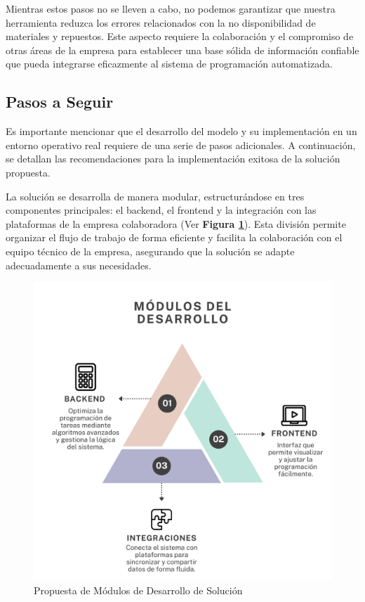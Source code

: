 \documentclass{article}
\begin{document}
Mientras estos pasos no se lleven a cabo, no podemos garantizar que nuestra herramienta reduzca los errores relacionados con la no disponibilidad de materiales y repuestos. Este aspecto requiere la colaboración y el compromiso de otras áreas de la empresa para establecer una base sólida de información confiable que pueda integrarse eficazmente al sistema de programación automatizada.

\subsection{Pasos a Seguir}

Es importante mencionar que el desarrollo del modelo y su implementación en un entorno operativo real requiere de una serie de pasos adicionales. A continuación, se detallan las recomendaciones para la implementación exitosa de la solución propuesta.

La solución se desarrolla de manera modular, estructurándose en tres componentes principales: el backend, el frontend y la integración con las plataformas de la empresa colaboradora (Ver \textbf{Figura \ref{fig:modulos-desarrollo}}). Esta división permite organizar el flujo de trabajo de forma eficiente y facilita la colaboración con el equipo técnico de la empresa, asegurando que la solución se adapte adecuadamente a sus necesidades.

\begin{figure}[htbp]
  \centering
  \includegraphics[scale=0.3]{imgs/ModulosDesarrollo.png}
  \caption{Propuesta de Módulos de Desarrollo de Solución}
  \label{fig:modulos-desarrollo}
\end{figure}
\end{document}
